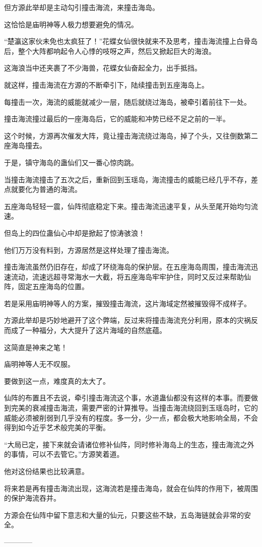 \begin{this_body}
但方源此举却是主动勾引撞击海流，来撞击海岛。

这恰恰是庙明神等人极力想要避免的情况。

“楚瀛这家伙未免也太疯狂了！”花蝶女仙很快就来不及思考，撞击海流撞上白骨岛后，整个大阵都响起令人心悸的吱呀之声，然后又掀起巨大的海浪。

这海浪当中还夹裹了不少海兽，花蝶女仙奋起全力，出手抵挡。

就这样，撞击海流在方源的不断牵引下，陆续撞击到五座海岛上。

每撞击一次，海流的威能就减少一层，随后就绕过海岛，被牵引着前往下一处。

撞击海流撞过最后的一座海岛后，它的威能和冲势已经不足之前的一半。

这个时候，方源再次催发大阵，竟让撞击海流绕过海岛，掉了个头，又往倒数第二座海岛撞去。

于是，镇守海岛的蛊仙们又一番心惊肉跳。

当撞击海流撞击了五次之后，重新回到玉瑶岛，海流撞击的威能已经几乎不存，差点就要化为普通的海流。

五座海岛轻轻一震，仙阵彻底稳定下来。撞击海流迅速平复，从头至尾开始均匀流速。

但岛上的四位蛊仙心中却是掀起了惊涛骇浪！

他们万万没有料到，方源居然是这样处理了撞击海流。

撞击海流虽然仍旧存在，却成了环绕海岛的保护层。在五座海岛周围，撞击海流迅速流动，流速远超寻常海水一大截，将五座海岛牢牢护住，同时又反过来帮助仙阵，固定五座海岛的位置。

若是采用庙明神等人的方案，摧毁撞击海流，这片海域定然被摧毁得不成样子。

方源此举却是巧妙地避开了这个弊端，反过来将撞击海流充分利用，原本的灾祸反而成了一种福分，大大提升了这片海域的自然底蕴。

这简直是神来之笔！

庙明神等人无不叹服。

要做到这一点，难度真的太大了。

仙阵的布置且不去说，牵引撞击海流这个事，水道蛊仙都没有这样的本事。而要做到完美的衰减撞击海流，需要严密的计算推导。当撞击海流绕回到玉瑶岛时，它的威能必须被削弱到几乎没有的程度。多一分，少一点，都会极大地影响全局，不会得到如今近乎艺术般完美的平衡。

“大局已定，接下来就会请诸位修补仙阵，同时修补海岛上的生态，撞击海流之外的事情，可以不去管它。”方源笑着道。

他对这份结果也比较满意。

将来若是再有撞击海流出现，这海流若是撞击海岛，就会在仙阵的作用下，被周围的保护海流吞并。

方源会在仙阵中留下意志和大量的仙元，只要这些不缺，五岛海链就会非常的安全。

------------

\end{this_body}


